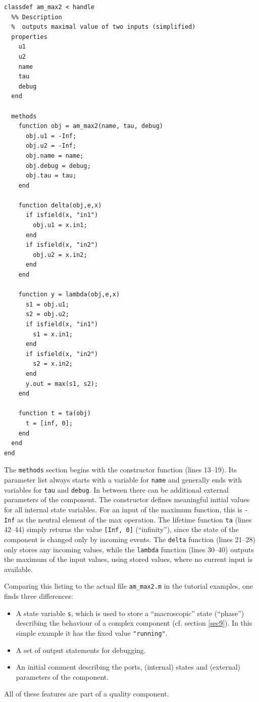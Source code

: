 \documentclass[12pt,oneside,a4paper,bibtotoc,BCOR=0pt,DIV=20]{scrreprt}
\newcommand{\cft}[1]{\mbox{\texttt{#1}}}   %
\newcommand{\defi}[1]{``#1''}
\begin{document}
\begin{lstlisting}[caption={Simplified code of \cft{am\_max2.m}.},captionpos=b,label=lst3]
classdef am_max2 < handle
  %% Description
  %  outputs maximal value of two inputs (simplified)
  properties
    u1
    u2
    name
    tau
    debug
  end

  methods
    function obj = am_max2(name, tau, debug)
      obj.u1 = -Inf;
      obj.u2 = -Inf;
      obj.name = name;
      obj.debug = debug;
      obj.tau = tau;
    end

    function delta(obj,e,x)
      if isfield(x, "in1")
        obj.u1 = x.in1;
      end
      if isfield(x, "in2")
        obj.u2 = x.in2;
      end
    end

    function y = lambda(obj,e,x)
      s1 = obj.u1;
      s2 = obj.u2;
      if isfield(x, "in1")
        s1 = x.in1;
      end
      if isfield(x, "in2")
        s2 = x.in2;
      end
      y.out = max(s1, s2);
    end

    function t = ta(obj)
      t = [inf, 0];
    end
  end
end
\end{lstlisting}

The \cft{methods} section begins with the constructor function (lines
13--19). Its parameter list always starts with a variable for \cft{name} and
generally ends with variables for \cft{tau} and \cft{debug}. In between there
can be additional external parameters of the component. The constructor defines
meaningful initial values for all internal state variables. For an input of the
maximum function, this is \cft{-Inf} as the neutral element of the max
operation. The lifetime function \cft{ta} (lines 42--44) simply returns the
value \cft{[Inf, 0]} (\defi{infinity}), since the state of the component is
changed only by incoming events. The \cft{delta} function (lines 21--28) only
stores any incoming values, while the \cft{lambda} function (lines 30--40)
outputs the maximum of the input values, using stored values, where no current
input is available.

Comparing this listing to the actual file \cft{am\_max2.m} in the tutorial
examples, one finds three differences:
\begin{itemize}
\item A state variable \cft{s}, which is used to store a \defi{macroscopic}
  state (\defi{phase}) describing the behaviour of a complex component
  (cf. section \ref{sec9}). In this simple example it has the fixed value
  \cft{"running"}.
\item A set of output statements for debugging.
\item An initial comment describing the ports, (internal) states and (external)
  parameters of the component.
\end{itemize}
All of these features are part of a quality component.
\end{document}
